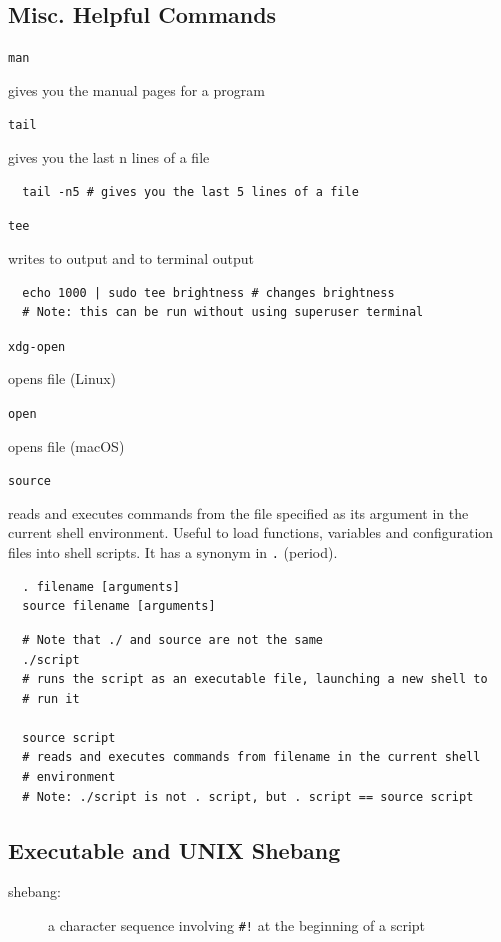 \documentclass[letterpaper,12pt]{article}
\newcommand*{\lstitem}[1]{
  \setbox0\hbox{\lstinline{#1}}
  \item[\usebox0]
}
\begin{document}
\subsection{Misc. Helpful Commands}

\begin{description}
 \lstitem{man} gives you the manual pages for a program
 \lstitem{tail} gives you the last n lines of a file
\end{description}

\begin{lstlisting}
  tail -n5 # gives you the last 5 lines of a file
\end{lstlisting}

\begin{description}
 \lstitem{tee} writes to output and to terminal output
\end{description}

\begin{lstlisting}
  echo 1000 | sudo tee brightness # changes brightness
  # Note: this can be run without using superuser terminal
\end{lstlisting}

\begin{description}
 \lstitem{xdg-open} opens file (Linux)
 \lstitem{open} opens file (macOS)
\end{description}

\begin{description}
 \lstitem{source} reads and executes commands from the file specified as its argument in the current shell environment. Useful to load functions, variables and configuration files into shell scripts. It has a synonym in \lstinline{.} (period).
\end{description}

\begin{lstlisting}
  . filename [arguments]
  source filename [arguments]
\end{lstlisting}

\begin{lstlisting}
  # Note that ./ and source are not the same
  ./script
  # runs the script as an executable file, launching a new shell to
  # run it

  source script
  # reads and executes commands from filename in the current shell
  # environment
  # Note: ./script is not . script, but . script == source script
\end{lstlisting}

\subsection{Executable and UNIX Shebang}
\begin{description}
 \item[shebang: ] a character sequence involving \lstinline{#!} at the beginning of a script
\end{description}
\end{document}
